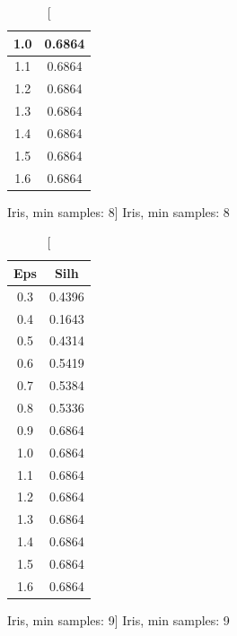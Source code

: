 \documentclass{classrep}
\begin{document}
{{{\begin{table}[!htbp]
\begin{minipage}{.24\textwidth}
\begin{tabular}{|c|c|}
                            1.0 & 0.6864 \\ \hline
                            1.1 & 0.6864 \\ \hline
                            1.2 & 0.6864 \\ \hline
                            1.3 & 0.6864 \\ \hline
                            1.4 & 0.6864 \\ \hline
                            1.5 & 0.6864 \\ \hline
                            1.6 & 0.6864 \\ \hline
                        \end{tabular}
                        \caption
                        [Iris, min samples: 8]
                        {Iris, min samples: 8}
                        \label{db_scan_table_Iris_eucl_min_sample8}
                    \end{minipage}
                    \hfill
                    \begin{minipage}{.24\textwidth}
                        \centering
                        \begin{tabular}{|c|c|}
                            \hline
                            Eps & Silh \\ \hline
                            0.3 & 0.4396 \\ \hline
                            0.4 & 0.1643 \\ \hline
                            0.5 & 0.4314 \\ \hline
                            0.6 & 0.5419 \\ \hline
                            0.7 & 0.5384 \\ \hline
                            0.8 & 0.5336 \\ \hline
                            0.9 & 0.6864 \\ \hline
                            1.0 & 0.6864 \\ \hline
                            1.1 & 0.6864 \\ \hline
                            1.2 & 0.6864 \\ \hline
                            1.3 & 0.6864 \\ \hline
                            1.4 & 0.6864 \\ \hline
                            1.5 & 0.6864 \\ \hline
                            1.6 & 0.6864 \\ \hline
                        \end{tabular}
                        \caption
                        [Iris, min samples: 9]
                        {Iris, min samples: 9}
                        \label{db_scan_table_Iris_eucl_min_sample9}
                    \end{minipage}
                \end{table}
                \FloatBarrier

}}}
\end{document}
